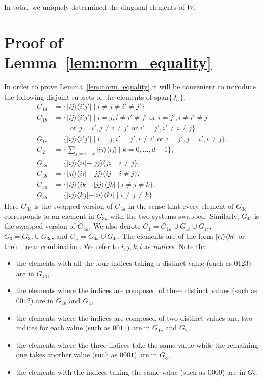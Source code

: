 \documentclass[a4paper,twocolumn,accepted=2022-10-23]{quantumarticle}
\newcommand{\ketbra}[2]{\vert {#1} \rangle\!\langle {#2} \vert}
\theoremstyle{definition}
\begin{document}
In total, we uniquely determined the diagonal elements of $W$.


\section{Proof of Lemma~\ref{lem:norm_equality}}\label{ap:offdiag}

In order to prove Lemma~\ref{lem:norm_equality} it will be convenient to introduce the following disjoint subsets of the elements of $\mathrm{span}\{ J_U\}$.
\begin{align*}
G_{1a} &= \{ \ketbra{ij}{i'j'} \mid i \neq j \neq i' \neq j' \} \\
G_{1b} &= \{ \ketbra{ij}{i'j'} \mid i = j, i \neq i' \neq j' \mbox{ or } i=j', i \neq i' \neq j \\
&\qquad \mbox{ or } j=i', j \neq i \neq j' \mbox{ or } i'=j', i' \neq i \neq j \} \\
G_{1c} &= \{ \ketbra{ij}{i'j'} \mid  i=j, i'=j', i \neq i' \mbox{ or } i=j',j=i', i \neq j  \}, \\
G_2 &= \{ \sum_{j=i+k} \ketbra{ij}{ij} \mid k=0, \ldots, d-1 \}, \\
G_{3a} &= \{ \ketbra{ij}{ii} - \ketbra{jj}{ji}  \mid i \neq j \}, \\
G_{3b} &= \{ \ketbra{ji}{ii} - \ketbra{jj}{ij} \mid i \neq j \}, \\
G_{4a} &= \{ \ketbra{ij}{ik} - \ketbra{jj}{jk}  \mid i \neq j \neq k \}, \\
G_{4b} &= \{ \ketbra{ij}{kj} - \ketbra{ii}{ki} \mid i \neq j \neq k \}.
\end{align*}
Here $G_{3b}$ is the swapped version of $G_{3a}$ in the sense that every element of $G_{3b}$ corresponds to an element in $G_{3a}$ with the two systems swapped.
Similarly, $G_{4b}$ is the swapped version of $G_{4a}$.
We also denote $G_1 = G_{1a} \cup G_{1b} \cup G_{1c}$, $G_3 = G_{3a} \cup G_{3b}$, and $G_4 = G_{4a} \cup G_{4b}$.  The elements are of the form $\ketbra{ij}{kl}$ or their linear combination.  We refer to $i, j, k, l$ as \textit{indices}.
Note that
\begin{itemize}
\item the elements with all the four indices taking a distinct value (such as $0123$) are in $G_{1a}$,
\item the elements where the indices are composed of three distinct values (such as $0012$) are in $G_{1b}$ and $G_4$,
\item the elements where the indices are composed of two distinct values and two indices for each value (such as $0011$) are in $G_{1c}$ and $G_2$,
\item the elements where the three indices take the same value while the remaining one takes another value (such as $0001$) are in $G_3$,
\item the elements with the indices taking the same value (such as $0000$) are in $G_2$.
\end{itemize}
\end{document}
